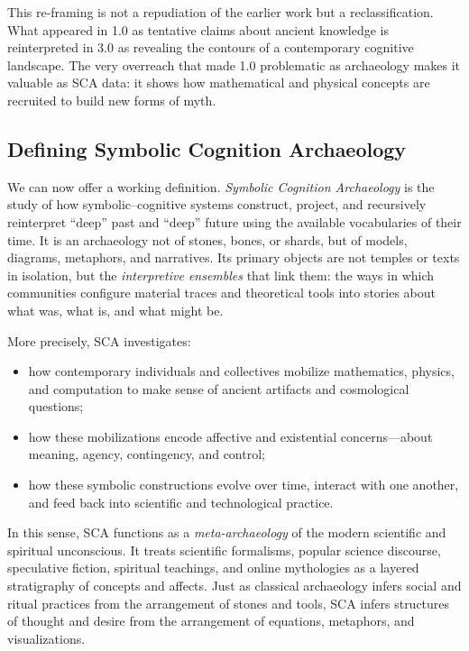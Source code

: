 \documentclass[12]{amsart}
\theoremstyle{plain}
\begin{document}
This re-framing is not a repudiation of the earlier work but a reclassification. What appeared in 1.0 as tentative claims about ancient knowledge is reinterpreted in 3.0 as revealing the contours of a contemporary cognitive landscape. The very overreach that made 1.0 problematic as archaeology makes it valuable as SCA data: it shows how mathematical and physical concepts are recruited to build new forms of myth.

\subsection{Defining Symbolic Cognition Archaeology}

We can now offer a working definition. \emph{Symbolic Cognition Archaeology} is the study of how symbolic–cognitive systems construct, project, and recursively reinterpret ``deep'' past and ``deep'' future using the available vocabularies of their time. It is an archaeology not of stones, bones, or shards, but of models, diagrams, metaphors, and narratives. Its primary objects are not temples or texts in isolation, but the \emph{interpretive ensembles} that link them: the ways in which communities configure material traces and theoretical tools into stories about what was, what is, and what might be.

More precisely, SCA investigates:

\begin{itemize}
  \item how contemporary individuals and collectives mobilize mathematics, physics, and computation to make sense of ancient artifacts and cosmological questions;
  \item how these mobilizations encode affective and existential concerns---about meaning, agency, contingency, and control;
  \item how these symbolic constructions evolve over time, interact with one another, and feed back into scientific and technological practice.
\end{itemize}

In this sense, SCA functions as a \emph{meta-archaeology} of the modern scientific and spiritual unconscious. It treats scientific formalisms, popular science discourse, speculative fiction, spiritual teachings, and online mythologies as a layered stratigraphy of concepts and affects. Just as classical archaeology infers social and ritual practices from the arrangement of stones and tools, SCA infers structures of thought and desire from the arrangement of equations, metaphors, and visualizations.
\end{document}
